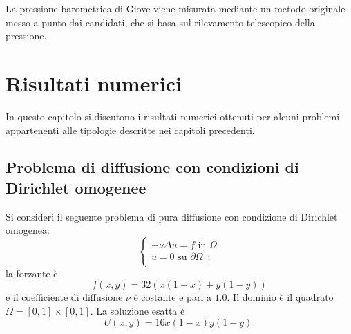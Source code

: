 \documentclass[%
	corpo=11pt,
    twoside,
    stile=classica,
    oldstyle,
    tipotesi=custom,
    greek,
    evenboxes,
]{toptesi}
\begin{document}



\sommario%
La pressione barometrica di Giove viene misurata mediante un metodo originale  messo a punto dai candidati, che si basa sul rilevamento telescopico della pressione.




\tablespagetrue\figurespagetrue%

\indici%








\mainmatter


\chapter{Risultati numerici}
In questo capitolo si discutono i risultati numerici ottenuti per alcuni problemi appartenenti alle tipologie descritte nei capitoli precedenti.

\section{Problema di diffusione con condizioni di Dirichlet omogenee}\label{sez-omog}


Si consideri il seguente problema di pura diffusione con condizione di Dirichlet omogenea:
\[
\begin{cases}
-\nu\Delta u = f \text{ in } \Omega \\
u = 0 \text{ su } \partial \Omega\,\,\,;
\end{cases}
\]
 la forzante è \[
 f(x, y) = 32(x(1 - x) + y(1 - y))
 \] e il coefficiente di diffusione $\nu$ è costante e pari a $1.0$. Il dominio è il quadrato  $\Omega = [0, 1] \times [0, 1]$. La soluzione esatta  è \[
 U(x, y) = 16x(1 - x)y(1 - y).
 \]
 
\end{document}

